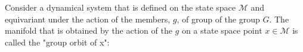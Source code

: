 \color{black}
Consider a dynamical system that is defined on the state space $\mathcal{M}$
and equivariant under the action of the members, $g$, of group of the group $G$.
The manifold that is obtained by the action of the $g$ on a state space point 
$x \in \mathcal{M}$ is called the "group orbit of x":
